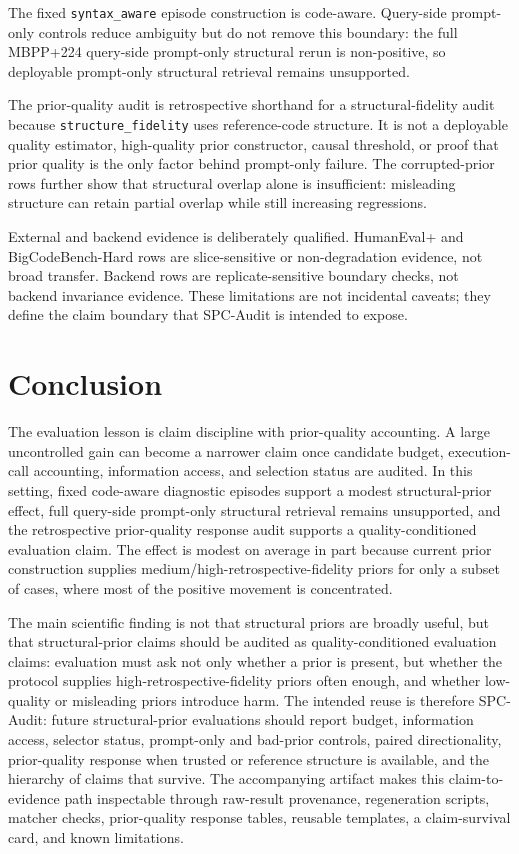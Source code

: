 \documentclass{article}
\begin{document}
The fixed \texttt{syntax\_aware} episode construction is code-aware. Query-side prompt-only controls reduce ambiguity but do not remove this boundary: the full MBPP+224 query-side prompt-only structural rerun is non-positive, so deployable prompt-only structural retrieval remains unsupported.

The prior-quality audit is retrospective shorthand for a structural-fidelity audit because \texttt{structure\_fidelity} uses reference-code structure. It is not a deployable quality estimator, high-quality prior constructor, causal threshold, or proof that prior quality is the only factor behind prompt-only failure. The corrupted-prior rows further show that structural overlap alone is insufficient: misleading structure can retain partial overlap while still increasing regressions.

External and backend evidence is deliberately qualified. HumanEval+ and BigCodeBench-Hard rows are slice-sensitive or non-degradation evidence, not broad transfer. Backend rows are replicate-sensitive boundary checks, not backend invariance evidence. These limitations are not incidental caveats; they define the claim boundary that SPC-Audit is intended to expose.

\section{Conclusion}
The evaluation lesson is claim discipline with prior-quality accounting. A large uncontrolled gain can become a narrower claim once candidate budget, execution-call accounting, information access, and selection status are audited. In this setting, fixed code-aware diagnostic episodes support a modest structural-prior effect, full query-side prompt-only structural retrieval remains unsupported, and the retrospective prior-quality response audit supports a quality-conditioned evaluation claim. The effect is modest on average in part because current prior construction supplies medium/high-retrospective-fidelity priors for only a subset of cases, where most of the positive movement is concentrated.

The main scientific finding is not that structural priors are broadly useful, but that structural-prior claims should be audited as quality-conditioned evaluation claims: evaluation must ask not only whether a prior is present, but whether the protocol supplies high-retrospective-fidelity priors often enough, and whether low-quality or misleading priors introduce harm. The intended reuse is therefore SPC-Audit: future structural-prior evaluations should report budget, information access, selector status, prompt-only and bad-prior controls, paired directionality, prior-quality response when trusted or reference structure is available, and the hierarchy of claims that survive. The accompanying artifact makes this claim-to-evidence path inspectable through raw-result provenance, regeneration scripts, matcher checks, prior-quality response tables, reusable templates, a claim-survival card, and known limitations.
\end{document}
